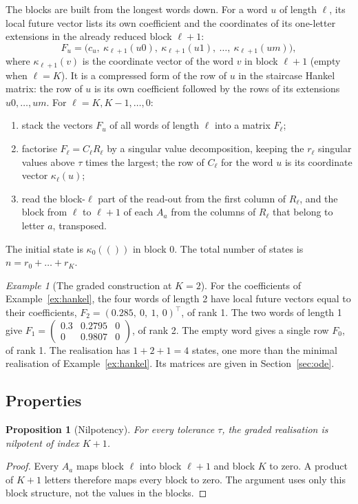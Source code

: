 \documentclass[11pt,a4paper]{article}
\newtheorem{proposition}{Proposition}
\theoremstyle{remark}
\newtheorem{example}{Example}
\begin{document}
The blocks are built from the longest words down.
For a word $u$ of length $\ell$, its local future vector lists its own coefficient and the coordinates of its one-letter extensions in the already reduced block $\ell+1$:
\begin{equation}
F_u=\bigl(c_u,\ \kappa_{\ell+1}(u0),\ \kappa_{\ell+1}(u1),\ \dots,\ \kappa_{\ell+1}(um)\bigr),
\end{equation}
where $\kappa_{\ell+1}(v)$ is the coordinate vector of the word $v$ in block $\ell+1$ (empty when $\ell=K$).
It is a compressed form of the row of $u$ in the staircase Hankel matrix: the row of $u$ is its own coefficient followed by the rows of its extensions $u0,\dots,um$.
For $\ell=K,K-1,\dots,0$:
\begin{enumerate}
\item stack the vectors $F_u$ of all words of length $\ell$ into a matrix $F_\ell$;
\item factorise $F_\ell=C_\ell R_\ell$ by a singular value decomposition, keeping the $r_\ell$ singular values above $\tau$ times the largest; the row of $C_\ell$ for the word $u$ is its coordinate vector $\kappa_\ell(u)$;
\item read the block-$\ell$ part of the read-out from the first column of $R_\ell$, and the block from $\ell$ to $\ell+1$ of each $A_a$ from the columns of $R_\ell$ that belong to letter $a$, transposed.
\end{enumerate}
The initial state is $\kappa_0(())$ in block 0.
The total number of states is $n=r_0+\dots+r_K$.

\begin{example}[The graded construction at $K=2$]\label{ex:graded}
For the coefficients of Example~\ref{ex:hankel}, the four words of length 2 have local future vectors equal to their coefficients, $F_2=(0.285,\ 0,\ 1,\ 0)^\top$, of rank 1.
The two words of length 1 give $F_1=\begin{pmatrix}0.3 & 0.2795 & 0\\0 & 0.9807 & 0\end{pmatrix}$, of rank 2.
The empty word gives a single row $F_0$, of rank 1.
The realisation has $1+2+1=4$ states, one more than the minimal realisation of Example~\ref{ex:hankel}.
Its matrices are given in Section~\ref{sec:ode}.
\end{example}

\subsection{Properties}
\begin{proposition}[Nilpotency]\label{prop:nilpotent}
For every tolerance $\tau$, the graded realisation is nilpotent of index $K+1$.
\end{proposition}
\begin{proof}
Every $A_a$ maps block $\ell$ into block $\ell+1$ and block $K$ to zero.
A product of $K+1$ letters therefore maps every block to zero.
The argument uses only this block structure, not the values in the blocks.
\end{proof}
\end{document}
